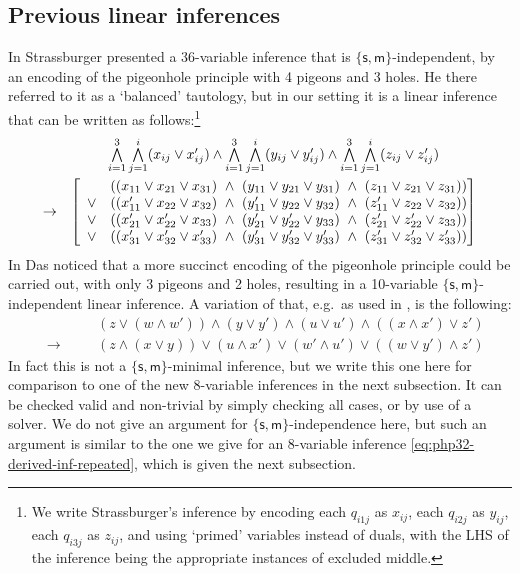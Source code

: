 \documentclass[a4paper, UKenglish, cleveref]{lipics-v2021}
\newcommand{\m}{\ensuremath{\mathsf{m}}}
\newcommand{\s}{\ensuremath{\mathsf{s}}}
\newcommand{\pp}[2]{x_{#1#2}}
\newcommand{\qq}[2]{y_{#1#2}}
\newcommand{\rr}[2]{z_{#1#2}} %
\begin{document}
\subsection{Previous linear inferences}
\label{sec:prev-lin-infs}
In \cite{Str12:ext-wo-cut} Strassburger presented a 36-variable inference that is $\{\s,\m\}$-independent, by an encoding of the pigeonhole principle with 4 pigeons and 3 holes.
He there referred to it as a `balanced' tautology, but in our setting it is a linear inference that can be written as follows:\footnote{We write Strassburger's inference by encoding each $q_{i1j}$ as $\pp i j $, each $q_{i2j}$ as $\qq i j $, each $q_{i3j}$ as $\rr i j $, and using `primed' variables instead of duals, with the LHS of the inference being the appropriate instances of excluded middle.}
\[
\begin{array}{rc}
& \bigwedge\limits_{i=1}^3 \bigwedge\limits_{j=1}^i (\pp i j \lor \pp i j ' )
\land
\bigwedge\limits_{i=1}^3 \bigwedge\limits_{j=1}^i (\qq i j \lor \qq i j ' )
\land
\bigwedge\limits_{i=1}^3 \bigwedge\limits_{j=1}^i (\rr i j \lor \rr i j ' )
\\
\noalign{\smallskip}
\to &
\left[
\begin{array}{r@{\quad ( (}l@{)\ \land \ (}l@{)\ \land \ (}l@{))}}
	 & \pp 1 1  \lor \pp 2 1  \lor \pp 3 1   & \qq 1 1 \lor \qq 2 1 \lor \qq 3 1  & \rr 1 1 \lor \rr 2 1 \lor \rr 3 1  \\
\lor  & \pp 1 1 ' \lor \pp 2 2 \lor \pp 3 2 & \qq 1 1 ' \lor \qq 2 2 \lor \qq 3 2 & \rr 1 1 ' \lor \rr 2 2 \lor \rr 3 2 \\
\lor & \pp 2 1 ' \lor \pp 2 2 ' \lor \pp 3 3 & \qq 2 1 ' \lor \qq 2 2 ' \lor \qq 3 3 & \rr 2 1 ' \lor \rr 2 2 ' \lor \rr 3 3 \\
\lor  & \pp 3 1 ' \lor \pp 3 2 ' \lor \pp 3 3 ' & \qq 3 1 ' \lor \qq 3 2 ' \lor \qq 3 3 ' & \rr 3 1 ' \lor \rr 3 2 ' \lor \rr 3 3 '
\end{array}
\right]
\end{array}
\]
In \cite{Das13:lin-inf-rew} Das noticed that a more succinct encoding of the pigeonhole principle could be carried out, with only 3 pigeons and 2 holes, resulting in a 10-variable $\{\s,\m \}$-independent linear inference.
A variation of that, e.g.\ as used in \cite{Das17:unavoidable-con-loop}, is the following:
\begin{equation}
\label{eq:10varinf-nonminimal}
\begin{alignedat}{2}
&&& (z \lor (w \land w')) \land (y \lor y') \land (u \lor u') \land ((x \land x') \lor z') \\
&\to &\quad& (z \land (x \lor y)) \lor (u \land x') \lor (w' \land u') \lor ((w \lor y') \land z')
\end{alignedat}
\end{equation}
%
%
%
%
%
%
%
%
%
%
%
In fact this is not a $\{ \s,\m \}$-minimal inference, but we write this one here for comparison to one of the new 8-variable inferences in the next subsection.
%
%
%
%
It can be checked valid and non-trivial by simply checking all cases, or by use of a solver.
We do not give an argument for $\{\s,\m \}$-independence here, but such an argument is similar to the one we give for an 8-variable inference \cref{eq:php32-derived-inf-repeated}, which is given the next subsection.
\end{document}
